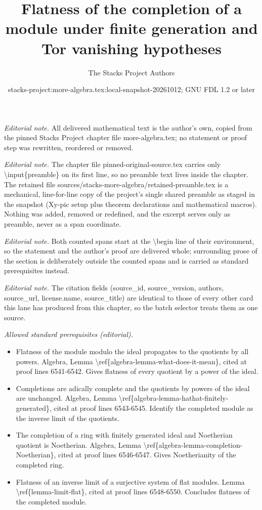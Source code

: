 \documentclass[10pt,a4paper]{amsart}
\title{Flatness of the completion of a module under finite generation and Tor vanishing hypotheses}
\author{The Stacks Project Authors}
\date{stacks-project:more-algebra.tex:local-snapshot-20261012; GNU FDL 1.2 or later}
\theoremstyle{plain}
\theoremstyle{definition}
\theoremstyle{remark}
\numberwithin{equation}{subsection}
\begin{document}
\maketitle
\setcounter{subsection}{1}
\noindent\textit{Editorial note.} All delivered mathematical text is the author's own, copied from the pinned Stacks Project chapter file more-algebra.tex; no statement or proof step was rewritten, reordered or removed.\par\medskip
\noindent\textit{Editorial note.} The chapter file pinned-original-source.tex carries only \textbackslash{}input\{preamble\} on its first line, so no preamble text lives inside the chapter. The retained file sources/stacks-more-algebra/retained-preamble.tex is a mechanical, line-for-line copy of the project's single shared preamble as staged in the snapshot (Xy-pic setup plus theorem declarations and mathematical macros). Nothing was added, removed or redefined, and the excerpt serves only as preamble, never as a span coordinate.\par\medskip
\noindent\textit{Editorial note.} Both counted spans start at the \textbackslash{}begin line of their environment, so the statement and the author's proof are delivered whole; surrounding prose of the section is deliberately outside the counted spans and is carried as standard prerequisites instead.\par\medskip
\noindent\textit{Editorial note.} The citation fields (source\_id, source\_version, authors, source\_url, license.name, source\_title) are identical to those of every other card this lane has produced from this chapter, so the batch selector treats them as one source.\par\medskip
\noindent\textit{Allowed standard prerequisites (editorial).}\begin{itemize}
\item Flatness of the module modulo the ideal propagates to the quotients by all powers. Algebra, Lemma \textbackslash{}ref\{algebra-lemma-what-does-it-mean\}, cited at proof lines 6541-6542. Gives flatness of every quotient by a power of the ideal.
\item Completions are adically complete and the quotients by powers of the ideal are unchanged. Algebra, Lemma \textbackslash{}ref\{algebra-lemma-hathat-finitely-generated\}, cited at proof lines 6543-6545. Identify the completed module as the inverse limit of the quotients.
\item The completion of a ring with finitely generated ideal and Noetherian quotient is Noetherian. Algebra, Lemma \textbackslash{}ref\{algebra-lemma-completion-Noetherian\}, cited at proof lines 6546-6547. Gives Noetherianity of the completed ring.
\item Flatness of an inverse limit of a surjective system of flat modules. Lemma \textbackslash{}ref\{lemma-limit-flat\}, cited at proof lines 6548-6550. Concludes flatness of the completed module.
\end{itemize}\medskip
\end{document}
